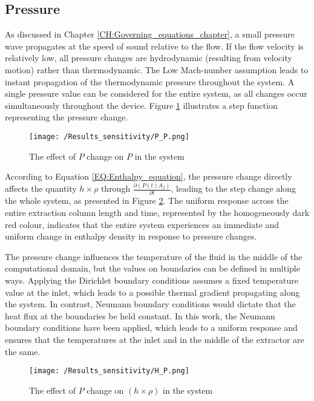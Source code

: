 \documentclass[../Article_Sensitivity_Analsysis.tex]{subfiles}
\begin{document}
	
	\subsection{Pressure}
	
	As discussed in Chapter \ref{CH:Governing_equations_chapter}, a small pressure wave propagates at the speed of sound relative to the flow. If the flow velocity is relatively low, all pressure changes are hydrodynamic (resulting from velocity motion) rather than thermodynamic. The Low Mach-number assumption leads to instant propagation of the thermodynamic pressure throughout the system. A single pressure value can be considered for the entire system, as all changes occur simultaneously throughout the device. Figure \ref{fig:Sensitivty_P_P} illustrates a step function representing the pressure change.
	
	\begin{figure}[h!]
		\centering
		\texttt{[image: /Results\_sensitivity/P\_P.png]}
		\caption{The effect of $P$ change on $P$ in the system}
		\label{fig:Sensitivty_P_P}
	\end{figure}
	
	According to Equation \ref{EQ:Enthalpy_equation}, the pressure change directly affects the quantity $h \times \rho$ through $\frac{\partial (P(t) A_f)}{\partial t}$, leading to the step change along the whole system, as presented in Figure \ref{fig:Sensitivty_P_H}. The uniform response across the entire extraction column length and time, represented by the homogeneously dark red colour, indicates that the entire system experiences an immediate and uniform change in enthalpy density in response to pressure changes. 
	
	The pressure change influences the temperature of the fluid in the middle of the computational domain, but the values on boundaries can be defined in multiple ways. Applying the Dirichlet boundary conditions assumes a fixed temperature value at the inlet, which leads to a possible thermal gradient propagating along the system. In contrast, Neumann boundary conditions would dictate that the heat flux at the boundaries be held constant. In this work, the Neumann boundary conditions have been applied, which leads to a uniform response and ensures that the temperatures at the inlet and in the middle of the extractor are the same.
	
	\begin{figure}[h!]
		\centering
		\texttt{[image: /Results\_sensitivity/H\_P.png]}
		\caption{The effect of $P$ change on $(h \times \rho)$ in the system}
		\label{fig:Sensitivty_P_H}
	\end{figure}
	
\end{document}

